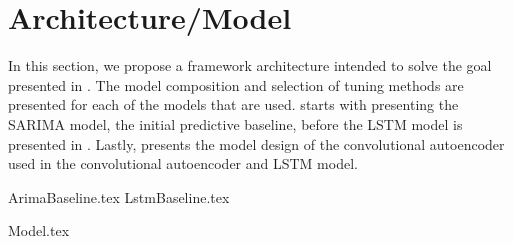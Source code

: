 \chapter{Architecture/Model}
\label{section:Architecture}

In this section, we propose a framework architecture intended to solve the goal presented in .
The model composition and selection of tuning methods are presented for each of the models that are used.
 starts with presenting the SARIMA model, the initial predictive baseline,
before the LSTM model is presented in .
Lastly,  presents the model design of the convolutional autoencoder used in the
convolutional autoencoder and LSTM model.


{ArimaBaseline.tex}
{LstmBaseline.tex}

{Model.tex}
